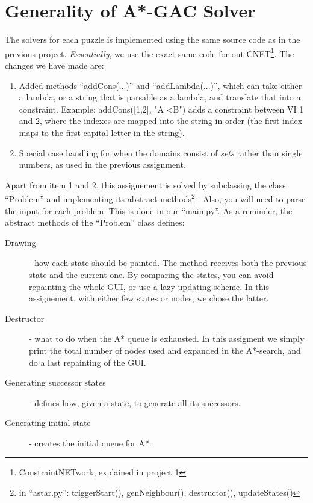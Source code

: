 \documentclass[journal]{IEEEtran}
\begin{document}
\section*{Generality of A*-GAC Solver}
The solvers for each puzzle is implemented using the same source code as in
the previous project. \textit{Essentially}, we use the exact same code for out 
CNET\footnote{ConstraintNETwork, explained in project 1}. The changes we have made
are:
\begin{enumerate}
    \item Added methods ``addCons(...)'' and ``addLambda(...)'', which can take
        either a lambda, or a string that is parsable as a lambda, and translate
        that into a constraint. 
        Example: addCons([1,2], "A \textless B") adds a constraint between VI
        1 and 2, where the indexes are mapped into the string
        in order (the first index maps
        to the first capital letter in the string).
    \item Special case handling for when the domains consist of \textit{sets} rather
        than single numbers, as used in the previous assignment.
\end{enumerate}
Apart from item 1 and 2, this assignement is solved by subclassing the class
``Problem'' and implementing its abstract methods\footnote{in ``astar.py'': triggerStart(), genNeighbour(), destructor(), updateStates()}
. Also, you will need to parse the input for each problem. This is done in our
``main.py''. As a reminder, the abstract methods of the ``Problem'' class
defines:
\begin{description}
    \item[Drawing] - how each state should be painted. The method receives 
        both the previous state and the current one. By comparing the states, you
        can avoid repainting the whole GUI, or use a lazy updating scheme.
        In this assignement, with either few states or nodes, we chose the latter.
    \item[Destructor] - what to do when the A* queue is exhausted. In this assigment
        we simply print the total number of nodes used and expanded in the
        A*-search, and do a last repainting of the GUI.
    \item[Generating successor states] - defines how, given a state, to generate
        all its successors.
    \item[Generating initial state] - creates the initial queue for A*.
\end{description}
\end{document}

